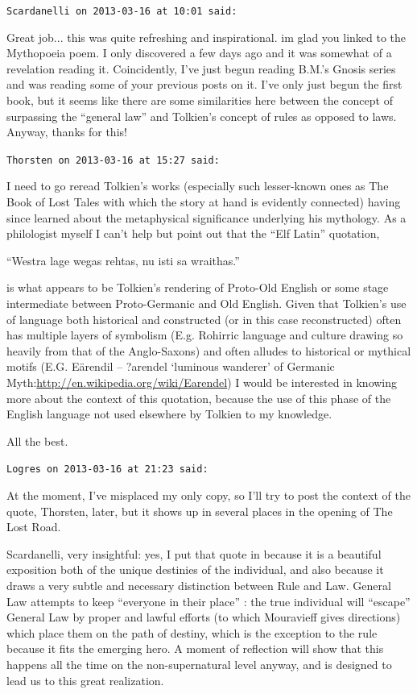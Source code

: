 \begin{footnotesize}
\begin{sffamily}
\texttt{Scardanelli on 2013-03-16 at 10:01 said:}

Great job... this was quite refreshing and inspirational. im glad you linked to the Mythopoeia poem. I only discovered a few days ago and it was somewhat of a revelation reading it. Coincidently, I've just begun reading B.M.'s Gnosis series and was reading some of your previous posts on it. I've only just begun the first book, but it seems like there are some similarities here between the concept of surpassing the ``general law'' and Tolkien's concept of rules as opposed to laws. Anyway, thanks for this!

\hfill

\texttt{Thorsten on 2013-03-16 at 15:27 said:}

I need to go reread Tolkien's works (especially such lesser-known ones as The Book of Lost Tales with which the story at hand is evidently connected) having since learned about the metaphysical significance underlying his mythology. As a philologist myself I can't help but point out that the ``Elf Latin'' quotation,

``Westra lage wegas rehtas, nu isti sa wraithas.''

is what appears to be Tolkien's rendering of Proto-Old English or some stage intermediate between Proto-Germanic and Old English. Given that Tolkien's use of language both historical and constructed (or in this case reconstructed) often has multiple layers of symbolism (E.g. Rohirric language and culture drawing so heavily from that of the Anglo-Saxons) and often alludes to historical or mythical motifs (E.G. Eärendil -- ?arendel `luminous wanderer' of Germanic Myth:\url{http://en.wikipedia.org/wiki/Earendel}) I would be interested in knowing more about the context of this quotation, because the use of this phase of the English language not used elsewhere by Tolkien to my knowledge.

All the best.

\hfill

\texttt{Logres on 2013-03-16 at 21:23 said:}

At the moment, I've misplaced my only copy, so I'll try to post the context of the quote, Thorsten, later, but it shows up in several places in the opening of The Lost Road.

Scardanelli, very insightful: yes, I put that quote in because it is a beautiful exposition both of the unique destinies of the individual, and also because it draws a very subtle and necessary distinction between Rule and Law. General Law attempts to keep ``everyone in their place'' : the true individual will ``escape'' General Law by proper and lawful efforts (to which Mouravieff gives directions) which place them on the path of destiny, which is the exception to the rule because it fits the emerging hero. A moment of reflection will show that this happens all the time on the non-supernatural level anyway, and is designed to lead us to this great realization.


\end{sffamily}
\end{footnotesize}
